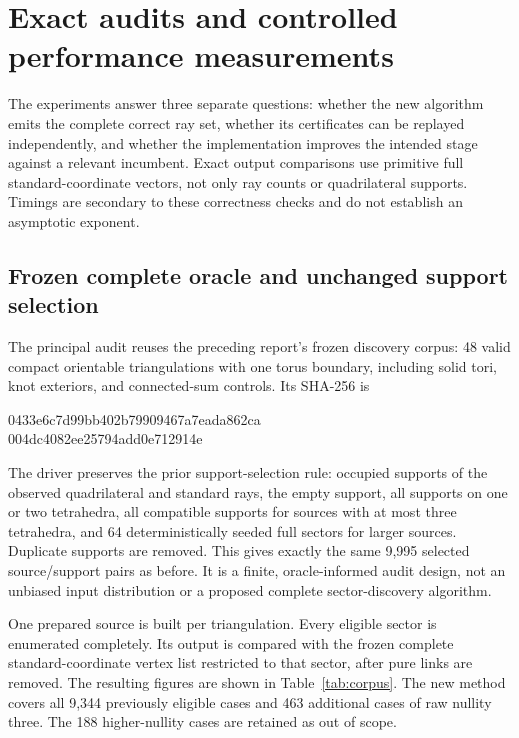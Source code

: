 \section{Exact audits and controlled performance measurements}
\label{sec:experiments}

The experiments answer three separate questions: whether the new
algorithm emits the complete correct ray set, whether its certificates
can be replayed independently, and whether the implementation improves
the intended stage against a relevant incumbent.  Exact output
comparisons use primitive full standard-coordinate vectors, not only
ray counts or quadrilateral supports.  Timings are secondary to these
correctness checks and do not establish an asymptotic exponent.

\subsection{Frozen complete oracle and unchanged support selection}

The principal audit reuses the preceding report's frozen discovery
corpus: 48 valid compact orientable triangulations with one torus
boundary, including solid tori, knot exteriors, and connected-sum
controls.  Its SHA-256 is
\begin{center}\footnotesize\ttfamily
0433e6c7d99bb402b79909467a7eada862ca\\
004dc4082ee25794add0e712914e
\end{center}
The driver preserves the prior support-selection rule: occupied
supports of the observed quadrilateral and standard rays, the empty
support, all supports on one or two tetrahedra, all compatible
supports for sources with at most three tetrahedra, and 64
deterministically seeded full sectors for larger sources.
Duplicate supports are removed.  This gives exactly the same 9,995
selected source/support pairs as before.  It is a finite,
oracle-informed audit design, not an unbiased input distribution or
a proposed complete sector-discovery algorithm.

One prepared source is built per triangulation.  Every eligible
sector is enumerated completely.  Its output is compared with the
frozen complete standard-coordinate vertex list restricted to that
sector, after pure links are removed.  The resulting figures are
shown in Table~\ref{tab:corpus}.  The new method covers all 9,344
previously eligible cases and 463 additional cases of raw nullity
three.  The 188 higher-nullity cases are retained as out of scope.

